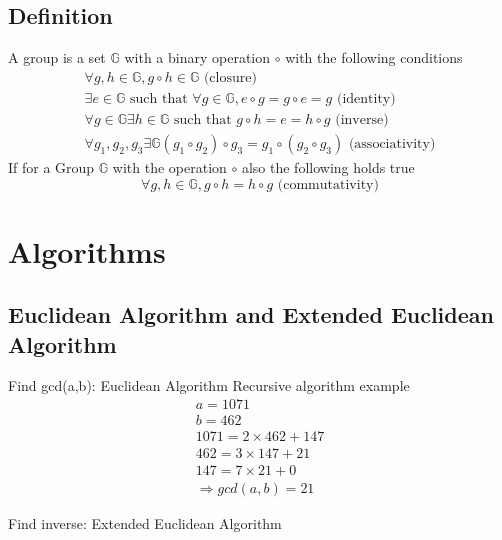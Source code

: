 \documentclass[a4paper]{article}
\begin{document}
\subsection{Definition}
A group is a set $\mathbb{G}$ with a binary operation $\circ$ with the following conditions
\begin{equation}
    \begin{split}
	\forall g,h \in \mathbb{G}, g \circ h \in \mathbb{G} \text{ (closure)}\\
	\exists e \in \mathbb{G} \text{ such that } \forall g \in \mathbb{G}, e \circ g = g \circ e = g \text{ (identity)} \\
	\forall g \in \mathbb{G} \exists h \in \mathbb{G} \text{ such that } g \circ h = e = h \circ g \text{ (inverse)}\\
	\forall g_1,g_2,g_3 \exists \mathbb{G} (g_1 \circ g_2) \circ g_3 = g_1 \circ (g_2 \circ g_3) \text{ (associativity)}
    \end{split}
    \label{group_definition}
\end{equation}
If for a Group $\mathbb{G}$ with the operation $\circ$ also the following holds true 
\begin{equation}
    \forall g,h \in \mathbb{G}, g \circ h = h \circ g \text{ (commutativity)}
    \label{group_abelian_defintion}
\end{equation}

\section{Algorithms}
\subsection{Euclidean Algorithm and Extended Euclidean Algorithm}
Find gcd(a,b): Euclidean Algorithm
Recursive algorithm example 
\begin{equation}
    \begin{split}
	a = 1071 \\
	b = 462 \\
	1071 = 2 \times 462 +  147 \\
	462 = 3 \times  147 + 21 \\
	147 = 7 \times 21 + 0 \\ 
	\Rightarrow gcd(a,b) = 21
    \end{split}
        \label{euclidean_example}
\end{equation}

Find inverse: Extended Euclidean Algorithm
\end{document}
